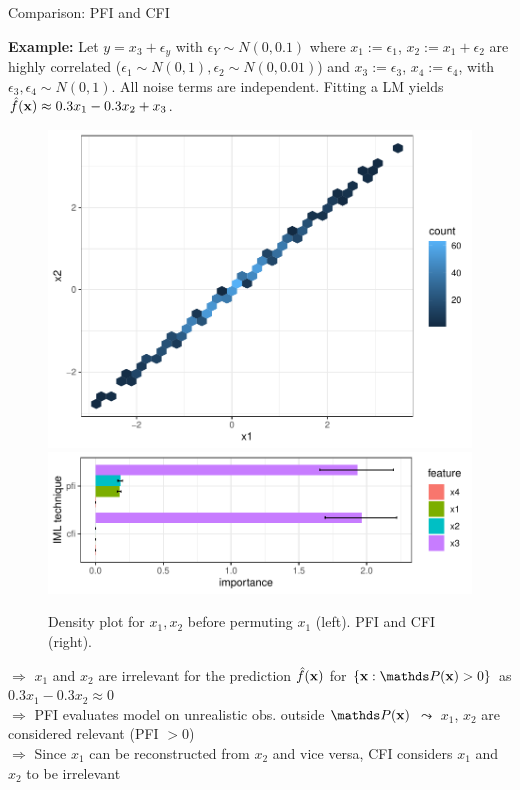 \documentclass[11pt,compress,t,notes=noshow, aspectratio=169, xcolor=table]{beamer}
\begin{document}
\begin{frame}{Comparison: PFI and CFI}
 
 \textbf{Example:} Let $y = x_3 + \epsilon_y$ with $\epsilon_Y \sim N(0, 0.1)$ where $x_1 :=  \epsilon_1$, $x_2 := x_1 + \epsilon_2$ are highly correlated ($\epsilon_1 \sim N(0,1), \epsilon_2 \sim N(0, 0.01)$) and $x_3 := \epsilon_3$, $x_4 := \epsilon_4$,  with $\epsilon_3, \epsilon_4 \sim N(0,1)$. All noise terms are independent.
 Fitting a LM yields $\fh(\xv) \approx 0.3 x_1 - 0.3 x_2 + x_3$.%
\begin{figure}
\hfill
  \includegraphics[width=0.25\linewidth]{figure_man/pfi_hexbin_pre.pdf}\hfill
  \includegraphics[width=0.6\linewidth]{figure_man/cfi_pfi.pdf} \hfill
  \caption{Density plot for $x_1, x_2$ before permuting $x_1$ (left). PFI and CFI (right).}
\end{figure}
% 
$\Rightarrow$ $x_1$ and $x_2$ are irrelevant for the prediction $\fh(\xv)$ for $\{\xv: \P(\xv) > 0\}$ as $0.3 x_1 - 0.3 x_2 \approx 0$ \\
$\Rightarrow$ PFI evaluates model on unrealistic obs. outside $\P(\xv)$ $\leadsto$ $x_1$, $x_2$ are considered relevant (PFI $> 0$) \\
$\Rightarrow$ Since $x_1$ can be reconstructed from $x_2$ and vice versa, CFI considers $x_1$ and $x_2$ to be irrelevant

 \end{frame}


\endlecture
\end{document}
